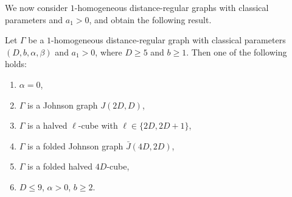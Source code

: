 We now consider $1$-homogeneous distance-regular graphs with classical parameters and $a_1 > 0$, and obtain the following result.

\begin{theorem}\label{classical}
Let $\Gamma$ be a $1$-homogeneous distance-regular graph with classical parameters $(D,b,\alpha, \beta)$ and $a_1>0$, where $D \geqslant 5$ and $b \geqslant 1$. Then one of the following holds:
\begin{enumerate}[\normalfont(i)]
  \item $\alpha=0$,
  \item $\Gamma$ is a Johnson graph $J(2D,D)$,
  \item $\Gamma$ is a halved $\ell$-cube with $\ell \in \{2D,2D+1\}$,
  \item $\Gamma$ is a folded Johnson graph $\bar{J}(4D,2D)$,
  \item $\Gamma$ is a folded halved $4D$-cube,
  \item $D \leqslant 9$, $\alpha>0$, $b\geqslant2$.
\end{enumerate}
\end{theorem}

